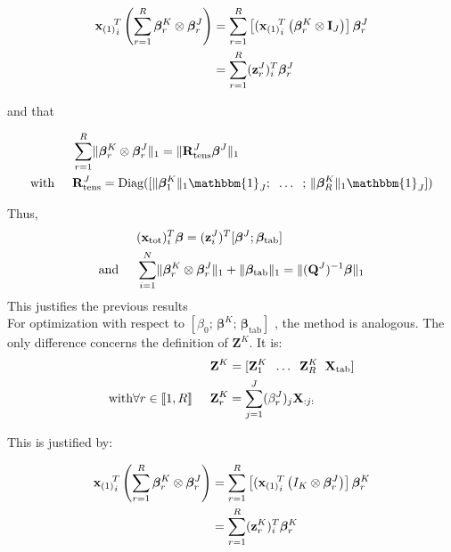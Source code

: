 \documentclass[10pt]{article}
\begin{document}
 \begin{align}
      {{\mathbf{x}_{(1)}}_i}^{\hspace{-5 pt} T} \left( \sum\limits_{r = 1}^R \bm{\beta}_r^K \otimes \bm{\beta}_r^J \right) &= \sum\limits_{r = 1}^R \left[({{\mathbf{x}_{(1)}}_i}^{\hspace{-5 pt} T}   \left( \bm{\beta}_r^K  \otimes \mathbf{I}_J\right)\right] \bm{\beta}_r^J\\
      &= \sum\limits_{r = 1}^R (\mathbf{z}_r^J)_i^T \bm{\beta}_r^J
\end{align}

\noindent and that

\begin{align}
    &\sum\limits_{r = 1}^R \lVert \bm{\beta}_r^K \otimes \bm{\beta}_r^J \rVert_1 = \lVert \mathbf{R}_{\text{tens}}^J \bm{\beta}^J\rVert_1\\
    \text{with} \hspace{0.5 cm} &\mathbf{R}_{\text{tens}}^J = \text{Diag}([\lVert \bm{\beta}_1^K \rVert_1 \mathbbm{1}_J; \; \; \hdots \; \; ; \,  \lVert \bm{\beta}_R^K \rVert_1 \mathbbm{1}_J ])
\end{align}

\noindent Thus,
\begin{align}
    &(\mathbf{x}_{\text{tot}})_i^T \bm{\beta}= (\mathbf{z}_i^J)^T [\bm{\beta}^J; \bm{\beta}_{\text{tab}}]  \\
    \text{and} \hspace{0.5 cm} & \sum\limits_{i = 1}^N 
    \lVert \bm{\beta}_r^K \otimes \bm{\beta}_r^J \rVert_1 + \lVert \bm{\beta}_{\text{tab}} \rVert_1= \lVert (\mathbf{Q}^J)^{-1} \bm{\beta} \rVert_1
\end{align}
This justifies the previous results\\[5 pt]
\noindent For optimization with respect to $\left[ \beta_0; \, \bm{\beta}^K; \, \bm{\beta}_{\text{tab}}  \right]$ , the method is analogous. The only difference concerns the definition of $\mathbf{Z}^K$. It is:
\begin{align}
& \mathbf{Z}^K = [\mathbf{Z}_1^K \; \; \hdots \; \; \mathbf{Z}_R^K \; \; \mathbf{X}_{\text{tab}}]\\
\text{with} \forall r \in \llbracket 1, R \rrbracket \hspace{0.5 cm} & \mathbf{Z}_r^K = \sum\limits_{j = 1}^J (\beta_r^J)_j \mathbf{X}_{:j:}
\end{align}

\noindent This is justified by:

\begin{align}
    {{\mathbf{x}_{(1)}}_i}^{\hspace{-5 pt} T}  \left( \sum\limits_{r = 1}^R \bm{\beta}_r^K \otimes \bm{\beta}_r^J \right) &= \sum\limits_{r = 1}^R \left[ ({{\mathbf{x}_{(1)}}_i}^{\hspace{-5 pt} T}  \left( I_K \otimes \bm{\beta}_r^J \right) \right] \bm{\beta}_r^K\\
    & = \sum\limits_{r = 1}^R (\mathbf{z}_r^K)_i^T \bm{\beta}_r^K
\end{align}
\end{document}

